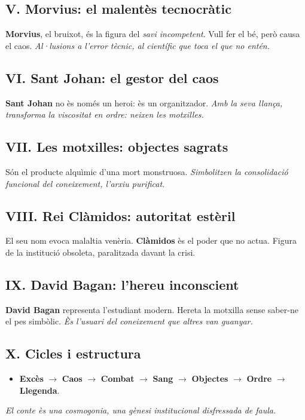 \subsection*{V. Morvius: el malent\`es tecnocr\`atic}
\textbf{Morvius}, el bruixot, és la figura del \emph{savi incompetent}. Vull fer el bé, però causa el caos. \textit{Al·lusions a l’error tècnic, al científic que toca el que no entén.}

\subsection*{VI. Sant Johan: el gestor del caos}
\textbf{Sant Johan} no \`es nom\'es un heroi: \`es un organitzador. \textit{Amb la seva llan\c{c}a, transforma la viscositat en ordre: neixen les motxilles.}

\subsection*{VII. Les motxilles: objectes sagrats}
S\'on el producte alqu\`imic d’una mort monstruosa. \textit{Simbolitzen la consolidaci\'o funcional del coneixement, l’arxiu purificat.}

\subsection*{VIII. Rei Cl\`amidos: autoritat est\`eril}
El seu nom evoca malaltia ven\`eria. \textbf{Cl\`amidos} \`es el poder que no actua. Figura de la instituci\'o obsoleta, paralitzada davant la crisi.

\subsection*{IX. David Bagan: l’hereu inconscient}
\textbf{David Bagan} representa l’estudiant modern. Hereta la motxilla sense saber-ne el pes simb\`olic. \textit{\`Es l’usuari del coneixement que altres van guanyar.}

\subsection*{X. Cicles i estructura}
\begin{itemize}
  \item \textbf{Exc\`es} $\rightarrow$ \textbf{Caos} $\rightarrow$ \textbf{Combat} $\rightarrow$ \textbf{Sang} $\rightarrow$ \textbf{Objectes} $\rightarrow$ \textbf{Ordre} $\rightarrow$ \textbf{Llegenda}.
\end{itemize}
\textit{El conte \`es una cosmogonia, una g\`enesi institucional disfressada de faula.}

